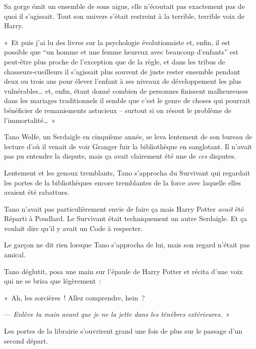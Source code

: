 Sa gorge émit un ensemble de sons aigus, elle n'écoutait pas exactement pas de quoi il s'agissait. Tout son univers s'était restreint à la terrible, terrible voix de Harry.

«~Et puis j'ai lu des livres sur la psychologie évolutionniste et, enfin, il est possible que “un homme et une femme heureux avec beaucoup d'enfants” est peut-être plus proche de l'exception que de la règle, et dans les tribus de chasseurs-cueilleurs il s'agissait plus souvent de juste rester ensemble pendant deux ou trois ans pour élever l'enfant à ses niveaux de développement les plus vulnérables… et, enfin, étant donné combien de personnes finissent malheureuses dans les mariages traditionnels il semble que c'est le genre de choses qui pourrait bénéficier de remaniements astucieux -- surtout si on résout le problème de l'immortalité…~»

\later

Tano Wolfe, un Serdaigle en cinquième année, se leva lentement de son bureau de lecture d'où il venait de voir Granger fuir la bibliothèque en sanglotant. Il n'avait pas pu entendre la dispute, mais ça avait clairement été une de \emph{ces} disputes.

Lentement et les genoux tremblants, Tano s'approcha du Survivant qui regardait les portes de la bibliothèques encore tremblantes de la force avec laquelle elles avaient été rabattues.

Tano n'avait pas particulièrement envie de faire ça mais Harry Potter \emph{avait} été Réparti à Poudlard. Le Survivant était techniquement un autre Serdaigle. Et ça voulait dire qu'il y avait un Code à respecter.

Le garçon ne dit rien lorsque Tano s'approcha de lui, mais son regard n'était pas amical.

Tano déglutit, posa une main sur l'épaule de Harry Potter et récita d'une voix qui ne se brisa que légèrement~:

«~Ah, les sorcières~! Allez comprendre, hein~?

--- \emph{Enlève ta main avant que je ne la jette dans les ténèbres extérieures.}~»

Les portes de la librairie s'ouvrirent grand une fois de plus sur le passage d'un second départ.
